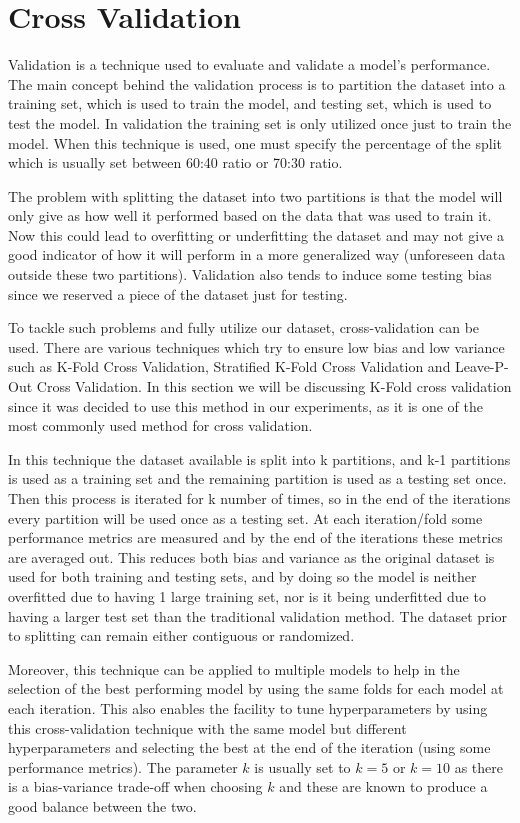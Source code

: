 \section{Cross Validation}\label{sec:cross_val_sec}
Validation is a technique used to evaluate and validate a model’s performance. The main concept behind the validation process is to partition the dataset into a training set, which is used to train the model, and testing set, which is used to test the model. In validation the training set is only utilized once just to train the model. When this technique is used, one must specify the percentage of the split which is usually set between 60:40 ratio or 70:30 ratio. 

\noindent The problem with splitting the dataset into two partitions is that the model will only give as how well it performed based on the data that was used to train it. Now this could lead to overfitting or underfitting the dataset and may not give a good indicator of how it will perform in a more generalized way (unforeseen data outside these two partitions).  Validation also tends to induce some testing bias since we reserved a piece of the dataset just for testing.  

\noindent To tackle such problems and fully utilize our dataset, cross-validation can be used. There are various techniques which try to ensure low bias and low variance such as K-Fold Cross Validation, Stratified K-Fold Cross Validation and Leave-P-Out Cross Validation. In this section we will be discussing K-Fold cross validation \cite{mosteller1968data} since it was decided to use this method in our experiments, as it is one of the most commonly used method for cross validation.   

\noindent In this technique the dataset available is split into k partitions, and k-1 partitions is used as a training set and the remaining partition is used as a testing set once. Then this process is iterated for k number of times, so in the end of the iterations every partition will be used once as a testing set. At each iteration/fold some performance metrics are measured and by the end of the iterations these metrics are averaged out. This reduces both bias and variance as the original dataset is used for both training and testing sets, and by doing so the model is neither overfitted due to having 1 large training set, nor is it being underfitted due to having a larger test set than the traditional validation method. The dataset prior to splitting can remain either contiguous or randomized.  

\noindent Moreover, this technique can be applied to multiple models to help in the selection of the best performing model by using the same folds for each model at each iteration. This also enables the facility to tune hyperparameters by using this cross-validation technique with the same model but different hyperparameters and selecting the best at the end of the iteration (using some performance metrics). The parameter \(k\) is usually set to \(k = 5\) or \(k = 10\) \cite{kuhn2013applied} as there is a bias-variance trade-off when choosing \(k\) and these are known to produce a good balance between the two. 